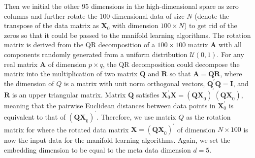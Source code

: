 \documentclass[11pt,a4paper,]{article}
\begin{document}
Then we initial the other 95 dimensions in the high-dimensional space as zero columns and further rotate the \(100\)-dimensional data of size \(N\) (denote the transpose of the data matrix as \(\pmb{X}_0\) with dimension \(100 \times N\)) to get rid of the zeros so that it could be passed to the manifold learning algorithms.
The rotation matrix is derived from the QR decomposition of a \(100\times 100\) matrix \(\pmb{A}\) with all components randomly generated from a uniform distribution \(\mathcal{U}(0,1)\).
For any real matrix \(\pmb{A}\) of dimension \(p\times q\), the QR decomposition could decompose the matrix into the multiplication of two matrix \(\pmb{Q}\) and \(\pmb{R}\) so that \(\pmb{A} = \pmb{QR}\), where the dimension of \(Q\) is a matrix with unit norm orthogonal vectors, \(\pmb{Q}^\prime \pmb{Q} = \pmb{I}\), and \(\pmb{R}\) is an upper triangular matrix. Matrix \(\pmb{Q}\) satisfies
\(\pmb{X}_0^\prime \pmb{X}=(\pmb{QX}_0)^\prime(\pmb{QX}_0)\), meaning that the pairwise Euclidean distances between data points in \(\pmb{X}_0^\prime\) is equivalent to that of \((\pmb{QX}_0)^\prime\). Therefore, we use matrix \(Q\) as the rotation matrix for where the rotated data matrix \(\pmb{X} = (\pmb{QX}_0)^\prime\) of dimension \(N \times 100\) is now the input data for the manifold learning algorithms. Again, we set the embedding dimension to be equal to the meta data dimension \(d=5\).
\end{document}

